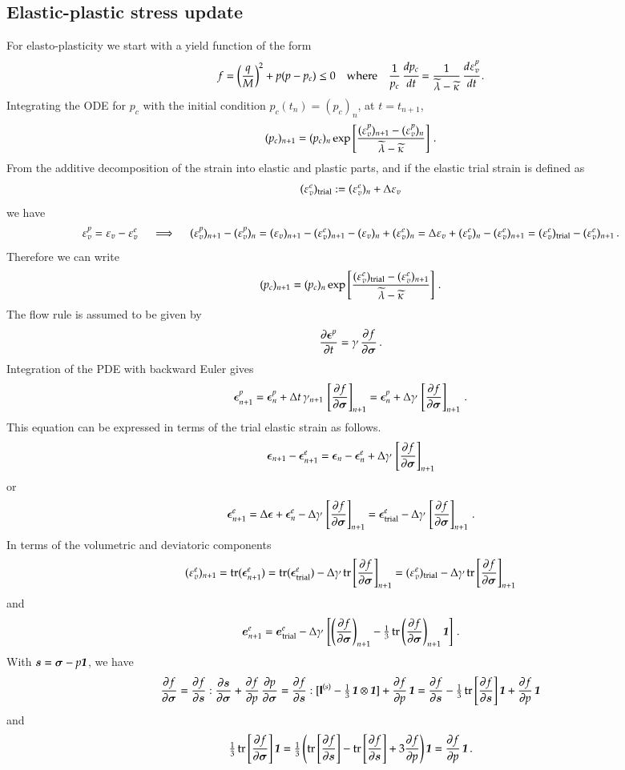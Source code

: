 \documentclass[twoside,10pt,a4paper]{article}
\begin{document}
\subsection{Elastic-plastic stress update}
For elasto-plasticity we start with a yield function of the form
\[
   f = \left(\frac{q}{M}\right)^2 + p(p-p_c) \le 0 
   \quad \text{where} \quad
  \frac{1}{p_c}\,\Deriv{p_c}{t} = \frac{1}{\lambdatilde- \kappatilde}\,\Deriv{\Ve_v^p}{t} \,.
\]
Integrating the ODE for $p_c$ with the initial condition $p_c(t_n) = (p_c)_n$, at $t = t_{n+1}$, 
\[
   (p_c)_{n+1} = (p_c)_n \exp\left[\frac{(\Ve_v^p)_{n+1} - (\Ve_v^p)_n}{\lambdatilde - \kappatilde}\right] \,.
\]
From the additive decomposition of the strain into elastic and plastic parts, and if the elastic trial 
strain is defined as 
\[
   (\Ve_v^e)_\Trial := (\Ve_v^e)_n + \Delta\Ve_v
\]
we have
\[
   \Ve_v^p = \Ve_v - \Ve_v^e \quad \implies \quad
   (\Ve_v^p)_{n+1} - (\Ve_v^p)_n = (\Ve_v)_{n+1} - (\Ve_v^e)_{n+1} - (\Ve_v)_{n} + (\Ve_v^e)_{n} 
                               = \Delta\Ve_v + (\Ve_v^e)_{n} - (\Ve_v^e)_{n+1} 
                               = (\Ve_v^e)_\Trial - (\Ve_v^e)_{n+1} \,.
\]
Therefore we can write
\[
   (p_c)_{n+1} = (p_c)_n \exp\left[\frac{(\Ve_v^e)_\Trial - (\Ve_v^e)_{n+1}}{\lambdatilde - \kappatilde}\right] \,.
\]
The flow rule is assumed to be given by
\[
   \Partial{\Beps^p}{t} = \gamma\,\Partial{f}{\Bsig} \,.
\]
Integration of the PDE with backward Euler gives
\[
  \Beps^p_{n+1} = \Beps^p_n + \Delta t\,\gamma_{n+1}\,\left[\Partial{f}{\Bsig}\right]_{n+1} 
             = \Beps^p_n + \Delta\gamma\,\left[\Partial{f}{\Bsig}\right]_{n+1} \,.
\]
This equation can be expressed in terms of the trial elastic strain as follows.
\[
  \Beps_{n+1}-\Beps^e_{n+1} = \Beps_n - \Beps^e_n + \Delta\gamma\,\left[\Partial{f}{\Bsig}\right]_{n+1} 
\]
or
\[
  \Beps^e_{n+1} = \Delta\Beps + \Beps^e_n - \Delta\gamma\,\left[\Partial{f}{\Bsig}\right]_{n+1} 
             = \Beps^e_\Trial - \Delta\gamma\,\left[\Partial{f}{\Bsig}\right]_{n+1} \,.
\]
In terms of the volumetric and deviatoric components
\[
  (\Ve_v^e)_{n+1} = \Tr(\Beps^e_{n+1}) = \Tr(\Beps^e_\Trial) - \Delta\gamma\,\Tr\left[\Partial{f}{\Bsig}\right]_{n+1} = (\Ve_v^e)_\Trial - \Delta\gamma\,\Tr\left[\Partial{f}{\Bsig}\right]_{n+1} 
\]
and
\[
  \BeT^e_{n+1} = \BeT^e_\Trial - \Delta\gamma\,\left[\left(\Partial{f}{\Bsig}\right)_{n+1}
      - \tfrac{1}{3}\,\Tr\left(\Partial{f}{\Bsig}\right)_{n+1}\Bone\right] \,.
\]
With $\BsT = \Bsig - p\Bone$, we have
\[
  \Partial{f}{\Bsig} = \Partial{f}{\BsT}:\Partial{\BsT}{\Bsig} + \Partial{f}{p}\,\Partial{p}{\Bsig}
    = \Partial{f}{\BsT}:[\SfI^{(s)} - \tfrac{1}{3}\,\Bone\otimes\Bone] 
      + \Partial{f}{p}\,\Bone
    = \Partial{f}{\BsT} - \tfrac{1}{3}\,\Tr\left[\Partial{f}{\BsT}\right]\Bone
      + \Partial{f}{p}\,\Bone
\]
and
\[
  \tfrac{1}{3}\,\Tr\left[\Partial{f}{\Bsig}\right]\Bone = 
    \tfrac{1}{3}\left(\Tr\left[\Partial{f}{\BsT}\right] - \Tr\left[\Partial{f}{\BsT}\right]
      + 3\Partial{f}{p}\right)\Bone  =  \Partial{f}{p}\,\Bone \,.
\]
\end{document}

